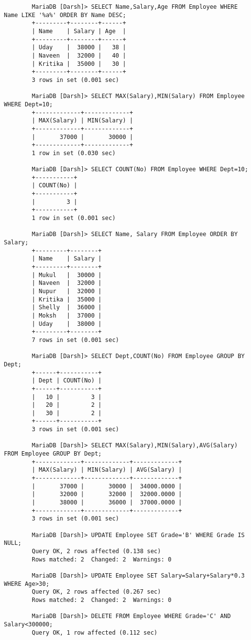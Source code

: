 \documentclass[
a4paper]{article}
\begin{document}
\begin{lstlisting}
		MariaDB [Darsh]> SELECT Name,Salary,Age FROM Employee WHERE Name LIKE '%a%' ORDER BY Name DESC;
		+---------+--------+------+
		| Name    | Salary | Age  |
		+---------+--------+------+
		| Uday    |  38000 |   38 |
		| Naveen  |  32000 |   40 |
		| Kritika |  35000 |   30 |
		+---------+--------+------+
		3 rows in set (0.001 sec)
		
		MariaDB [Darsh]> SELECT MAX(Salary),MIN(Salary) FROM Employee WHERE Dept=10;
		+-------------+-------------+
		| MAX(Salary) | MIN(Salary) |
		+-------------+-------------+
		|       37000 |       30000 |
		+-------------+-------------+
		1 row in set (0.030 sec)
		
		MariaDB [Darsh]> SELECT COUNT(No) FROM Employee WHERE Dept=10;
		+-----------+
		| COUNT(No) |
		+-----------+
		|         3 |
		+-----------+
		1 row in set (0.001 sec)
		
		MariaDB [Darsh]> SELECT Name, Salary FROM Employee ORDER BY Salary;
		+---------+--------+
		| Name    | Salary |
		+---------+--------+
		| Mukul   |  30000 |
		| Naveen  |  32000 |
		| Nupur   |  32000 |
		| Kritika |  35000 |
		| Shelly  |  36000 |
		| Moksh   |  37000 |
		| Uday    |  38000 |
		+---------+--------+
		7 rows in set (0.001 sec)
		
		MariaDB [Darsh]> SELECT Dept,COUNT(No) FROM Employee GROUP BY Dept;
		+------+-----------+
		| Dept | COUNT(No) |
		+------+-----------+
		|   10 |         3 |
		|   20 |         2 |
		|   30 |         2 |
		+------+-----------+
		3 rows in set (0.001 sec)
		
		MariaDB [Darsh]> SELECT MAX(Salary),MIN(Salary),AVG(Salary) FROM Employee GROUP BY Dept;
		+-------------+-------------+-------------+
		| MAX(Salary) | MIN(Salary) | AVG(Salary) |
		+-------------+-------------+-------------+
		|       37000 |       30000 |  34000.0000 |
		|       32000 |       32000 |  32000.0000 |
		|       38000 |       36000 |  37000.0000 |
		+-------------+-------------+-------------+
		3 rows in set (0.001 sec)
		
		MariaDB [Darsh]> UPDATE Employee SET Grade='B' WHERE Grade IS NULL;
		Query OK, 2 rows affected (0.138 sec)
		Rows matched: 2  Changed: 2  Warnings: 0
		
		MariaDB [Darsh]> UPDATE Employee SET Salary=Salary+Salary*0.3 WHERE Age>30;
		Query OK, 2 rows affected (0.267 sec)
		Rows matched: 2  Changed: 2  Warnings: 0
		
		MariaDB [Darsh]> DELETE FROM Employee WHERE Grade='C' AND Salary<300000;
		Query OK, 1 row affected (0.112 sec)
		

\end{lstlisting}
\end{document}
